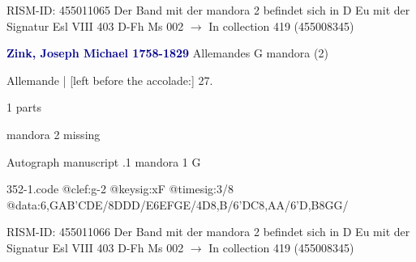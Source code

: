 \documentclass[twocolumn]{book}
\begin{document}
\newline RISM-ID: 455011065
\newline Der Band mit der mandora 2 befindet sich in D Eu mit der Signatur Esl VIII 403
\newline D-Fh  Ms 002
\newline $\rightarrow$ In collection 419 (455008345)

\newline \par \vspace{7pt} \textcolor{darkblue}{\textbf{Zink, Joseph Michael  1758-1829}}
\newline Allemandes  G  
\newline mandora (2)
\newline \begin{itshape}[f.17r, at left:] Allemande | [left before the accolade:] 27.\end{itshape} 
\newline \textcolor{darkblue}{}  1 parts  
\newline \begin{small} mandora 2 missing\end{small} 
\newline Autograph manuscript
.1  mandora 1  G  
\begin{filecontents*}{352-1.code}
@clef:g-2
@keysig:xF
@timesig:3/8
@data:{6,GA}{B'C}DE/8DDD/E{6EF}{GE}/4D8,B/{6'DC}8,AA/{6'D,B}8GG/
\end{filecontents*}
\newline
%

\newline RISM-ID: 455011066
\newline Der Band mit der mandora 2 befindet sich in D Eu mit der Signatur Esl VIII 403
\newline D-Fh  Ms 002
\newline $\rightarrow$ In collection 419 (455008345)
\end{document}
